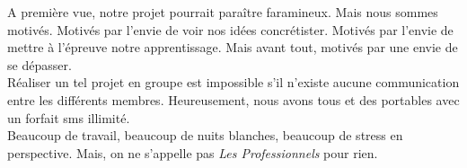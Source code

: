 \documentclass{report}
\begin{document}
A première vue, notre projet pourrait paraître faramineux. Mais nous sommes motivés. Motivés par l'envie de voir nos idées concrétister. Motivés par l'envie de mettre à l'épreuve notre apprentissage. Mais avant tout, motivés par une envie de se dépasser. \\

Réaliser un tel projet en groupe est impossible s'il n'existe aucune communication entre les différents membres. Heureusement, nous avons tous  et des portables avec un forfait sms illimité. \\

Beaucoup de travail, beaucoup de nuits blanches, beaucoup de stress en perspective\@. Mais, on ne s'appelle pas \emph{Les Professionnels} pour rien.
\end{document}
